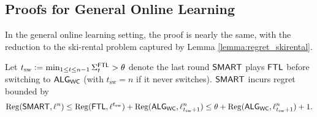 
\subsection{Proofs for General Online Learning}

In the general online learning setting, the proof is nearly the same, with the reduction to the ski-rental problem captured by Lemma \ref{lemma:regret_skirental}.
\begin{lemma} \label{lemma:regret_skirental}
Let $t_{\mathrm{sw}} \mathrel{\mathop{:}}= \min_{1 \le t \le n-1} \Sigma^{\mathsf{FTL}}_t > \theta$ denote the last round $\mathsf{SMART}$ plays $\mathsf{FTL}$ before switching to $\mathsf{ALG}_{\mathsf{WC}}$ (with $t_{\mathrm{sw}}=n$ if it never switches). $\mathsf{SMART}$ incurs regret bounded by
\[\mathrm{Reg}(\mathsf{SMART}, \ell^n) \leq \mathrm{Reg}(\mathsf{FTL}, \ell^{t_{\mathrm{sw}}}) + \mathrm{Reg}(\mathsf{ALG}_{\mathsf{WC}}, \ell_{t_{\mathrm{sw}}+1}^n) \leq \theta + \mathrm{Reg}(\mathsf{ALG}_{\mathsf{WC}}, \ell_{t_{\mathrm{sw}}+1}^n) + 1.\]
\end{lemma}

